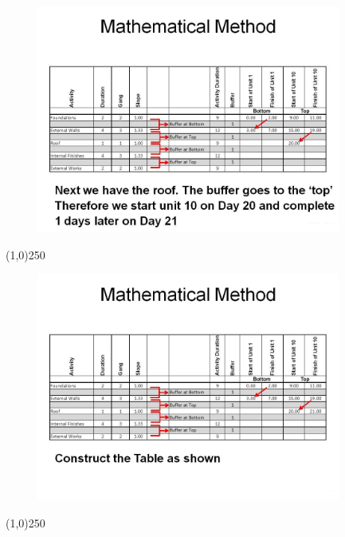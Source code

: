 \begin{frame}
\begin{figure}
	\centering
		\includegraphics[width = 10.0cm]{oldnotes/Slide289.jpg}
\end{figure}
\end{frame}
\begin{center}\line(1,0){250}\end{center}






\begin{frame}
\begin{figure}
	\centering
		\includegraphics[width = 10.0cm]{oldnotes/Slide290.jpg}
\end{figure}
\end{frame}
\begin{center}\line(1,0){250}\end{center}






